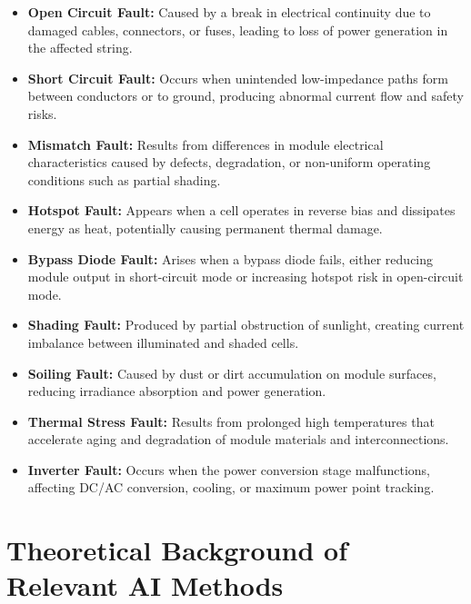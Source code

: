 \begin{itemize}
    \item \textbf{Open Circuit Fault:} Caused by a break in electrical continuity due to damaged cables, connectors, or fuses, leading to loss of power generation in the affected string.

    \item \textbf{Short Circuit Fault:} Occurs when unintended low-impedance paths form between conductors or to ground, producing abnormal current flow and safety risks.

    \item \textbf{Mismatch Fault:} Results from differences in module electrical characteristics caused by defects, degradation, or non-uniform operating conditions such as partial shading.

    \item \textbf{Hotspot Fault:} Appears when a cell operates in reverse bias and dissipates energy as heat, potentially causing permanent thermal damage.

    \item \textbf{Bypass Diode Fault:} Arises when a bypass diode fails, either reducing module output in short-circuit mode or increasing hotspot risk in open-circuit mode.

    \item \textbf{Shading Fault:} Produced by partial obstruction of sunlight, creating current imbalance between illuminated and shaded cells.

    \item \textbf{Soiling Fault:} Caused by dust or dirt accumulation on module surfaces, reducing irradiance absorption and power generation.

    \item \textbf{Thermal Stress Fault:} Results from prolonged high temperatures that accelerate aging and degradation of module materials and interconnections.

    \item \textbf{Inverter Fault:} Occurs when the power conversion stage malfunctions, affecting DC/AC conversion, cooling, or maximum power point tracking.
\end{itemize}

\section{Theoretical Background of Relevant AI Methods}
\label{sec:ai-fdd}

